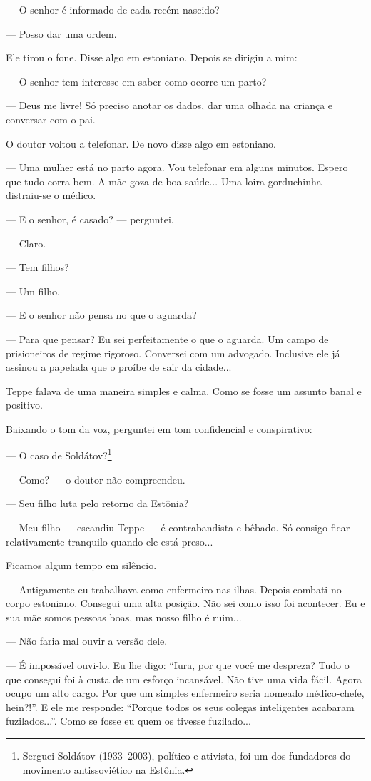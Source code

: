 --- O senhor é informado de cada recém-nascido?

--- Posso dar uma ordem.

Ele tirou o fone. Disse algo em estoniano. Depois se dirigiu a mim:

--- O senhor tem interesse em saber como ocorre um parto?

--- Deus me livre! Só preciso anotar os dados, dar uma olhada na criança
e conversar com o pai.

O doutor voltou a telefonar. De novo disse algo em estoniano.

--- Uma mulher está no parto agora. Vou telefonar em alguns minutos.
Espero que tudo corra bem. A mãe goza de boa saúde... Uma loira
gorduchinha --- distraiu-se o médico.

--- E o senhor, é casado? --- perguntei.

--- Claro.

--- Tem filhos?

--- Um filho.

--- E o senhor não pensa no que o aguarda?

--- Para que pensar? Eu sei perfeitamente o que o aguarda. Um campo de
prisioneiros de regime rigoroso. Conversei com um advogado. Inclusive
ele já assinou a papelada que o proíbe de sair da cidade...

Teppe falava de uma maneira simples e calma. Como se fosse um assunto
banal e positivo.

Baixando o tom da voz, perguntei em tom confidencial e conspirativo:

--- O caso de Soldátov?\footnote{Serguei Soldátov (1933\emph{--}2003),
  político e ativista, foi um dos fundadores do movimento antissoviético
  na Estônia.}

--- Como? --- o doutor não compreendeu.

--- Seu filho luta pelo retorno da Estônia?

--- Meu filho --- escandiu Teppe --- é contrabandista e bêbado. Só
consigo ficar relativamente tranquilo quando ele está preso...

Ficamos algum tempo em silêncio.

--- Antigamente eu trabalhava como enfermeiro nas ilhas. Depois combati
no corpo estoniano. Consegui uma alta posição. Não sei como isso foi
acontecer. Eu e sua mãe somos pessoas boas, mas nosso filho é ruim...

--- Não faria mal ouvir a versão dele.

--- É impossível ouvi-lo. Eu lhe digo: ``Iura, por que você me despreza?
Tudo o que consegui foi à custa de um esforço incansável. Não tive uma
vida fácil. Agora ocupo um alto cargo. Por que um simples enfermeiro
seria nomeado médico-chefe, hein?!''. E ele me responde: ``Porque todos
os seus colegas inteligentes acabaram fuzilados...''. Como se fosse eu
quem os tivesse fuzilado...

